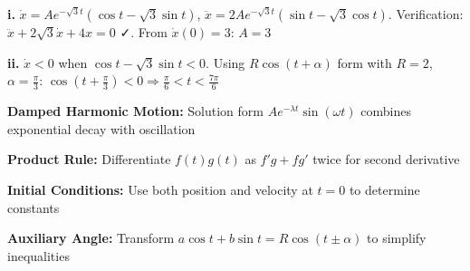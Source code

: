 \begin{solution}
\textbf{i.} $\dot{x} = Ae^{-\sqrt{3}t}(\cos t - \sqrt{3}\sin t)$, $\ddot{x} = 2Ae^{-\sqrt{3}t}(\sin t - \sqrt{3}\cos t)$. Verification: $\ddot{x} + 2\sqrt{3}\dot{x} + 4x = 0$ ✓. From $\dot{x}(0) = 3$: $A = 3$

\textbf{ii.} $\dot{x} < 0$ when $\cos t - \sqrt{3}\sin t < 0$. Using $R\cos(t+\alpha)$ form with $R=2$, $\alpha = \frac{\pi}{3}$: $\cos(t+\frac{\pi}{3}) < 0 \Rightarrow \frac{\pi}{6} < t < \frac{7\pi}{6}$
\end{solution}

\begin{takeaways}
\item \textbf{Damped Harmonic Motion:} Solution form $Ae^{-\lambda t}\sin(\omega t)$ combines exponential decay with oscillation
\item \textbf{Product Rule:} Differentiate $f(t)g(t)$ as $f'g + fg'$ twice for second derivative
\item \textbf{Initial Conditions:} Use both position and velocity at $t=0$ to determine constants
\item \textbf{Auxiliary Angle:} Transform $a\cos t + b\sin t = R\cos(t \pm \alpha)$ to simplify inequalities
\end{takeaways}
